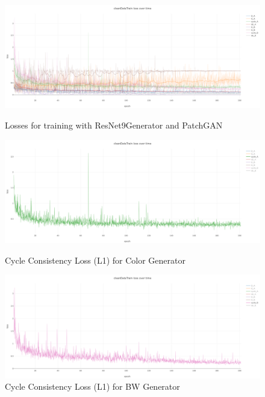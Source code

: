\begin{figure}[htbp]
    \centering
    \includegraphics[width=1\textwidth]{chapter/losses_png/all.png}
    \caption{Losses for training with ResNet9Generator and PatchGAN}

    \includegraphics[width=1\textwidth]{chapter/losses_png/cycle_a.png}
    \caption{Cycle Consistency Loss (L1) for Color Generator}
    
    \includegraphics[width=1\textwidth]{chapter/losses_png/cycle_b.png}
    \caption{Cycle Consistency Loss (L1) for BW Generator}
    \end{figure}
    \pagebreak
    \newpage
